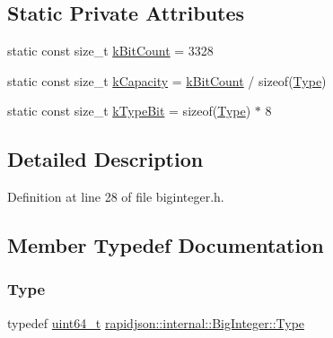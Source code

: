 \subsection*{Static Private Attributes}
\begin{DoxyCompactItemize}
\item 
static const size\+\_\+t \mbox{\hyperlink{classrapidjson_1_1internal_1_1_big_integer_aef84cafb23eff42fdca40ef9d9fc7f98}{k\+Bit\+Count}} = 3328
\item 
static const size\+\_\+t \mbox{\hyperlink{classrapidjson_1_1internal_1_1_big_integer_aad4550b1fb2215bbbdc92f1773bc988c}{k\+Capacity}} = \mbox{\hyperlink{classrapidjson_1_1internal_1_1_big_integer_aef84cafb23eff42fdca40ef9d9fc7f98}{k\+Bit\+Count}} / sizeof(\mbox{\hyperlink{classrapidjson_1_1internal_1_1_big_integer_a37d8e8c111f0d76fa07bb4da4790514d}{Type}})
\item 
static const size\+\_\+t \mbox{\hyperlink{classrapidjson_1_1internal_1_1_big_integer_a947ac91b3471b15a442e9c90db566658}{k\+Type\+Bit}} = sizeof(\mbox{\hyperlink{classrapidjson_1_1internal_1_1_big_integer_a37d8e8c111f0d76fa07bb4da4790514d}{Type}}) $\ast$ 8
\end{DoxyCompactItemize}


\subsection{Detailed Description}


Definition at line 28 of file biginteger.\+h.



\subsection{Member Typedef Documentation}
\mbox{\label{classrapidjson_1_1internal_1_1_big_integer_a37d8e8c111f0d76fa07bb4da4790514d}} 
\subsubsection{\texorpdfstring{Type}{Type}}
{\footnotesize\ttfamily typedef \mbox{\hyperlink{stdint_8h_aec6fcb673ff035718c238c8c9d544c47}{uint64\+\_\+t}} \mbox{\hyperlink{classrapidjson_1_1internal_1_1_big_integer_a37d8e8c111f0d76fa07bb4da4790514d}{rapidjson\+::internal\+::\+Big\+Integer\+::\+Type}}}



